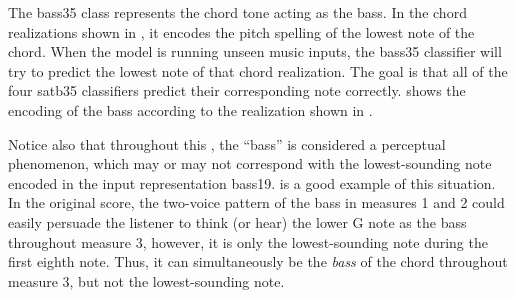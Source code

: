 
The \gls{bass35} class represents the chord tone acting as
the bass. In the chord realizations shown in
, it encodes the pitch spelling of the
lowest note of the chord. When the model is running unseen
music inputs, the \gls{bass35} classifier will try to
predict the lowest note of that chord realization. The goal
is that all of the four \gls{satb35} classifiers predict
their corresponding note correctly.  shows
the encoding of the bass according to the realization shown
in .

Notice also that throughout this \thesisdiss{}, the ``bass''
is considered a perceptual phenomenon, which may or may not
correspond with the lowest-sounding note encoded in the
input representation \gls{bass19}.  is
a good example of this situation. In the original score, the
two-voice pattern of the bass in measures 1 and 2 could
easily persuade the listener to think (or hear) the lower G
note as the bass throughout measure 3, however, it is only
the lowest-sounding note during the first eighth note. Thus,
it can simultaneously be the \emph{bass} of the chord
throughout measure 3, but not the lowest-sounding note.



